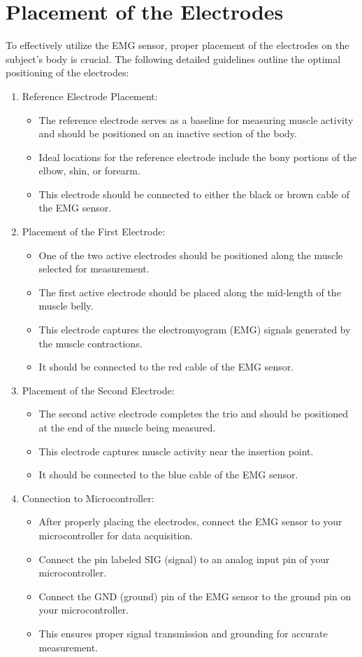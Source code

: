 \documentclass[ 12pt,a4paper,twocolumn,fleqn]{report}
\begin{document}
\section{Placement of the Electrodes}\vskip 6pt
To effectively utilize the EMG sensor, proper placement of the electrodes on the subject's body is crucial. The following detailed guidelines outline the optimal positioning of the electrodes:\vskip 6pt
\begin{enumerate}
    \item Reference Electrode Placement:
    \begin{itemize}
    

   \item  The reference electrode serves as a baseline for measuring muscle activity and should be positioned on an inactive section of the body.
   \item  Ideal locations for the reference electrode include the bony portions of the elbow, shin, or forearm.
   \item  This electrode should be connected to either the black or brown cable of the EMG sensor.
\end{itemize}
   \item  Placement of the First Electrode:
   \begin{itemize}
   \item One of the two active electrodes should be positioned along the muscle selected for measurement.
   \item The first active electrode should be placed along the mid-length of the muscle belly.
   \item This electrode captures the electromyogram (EMG) signals generated by the muscle contractions.
   \item It should be connected to the red cable of the EMG sensor.
   \end{itemize}
\item Placement of the Second Electrode:
\begin{itemize}
   \item The second active electrode completes the trio and should be positioned at the end of the muscle being measured.
   \item This electrode captures muscle activity near the insertion point.
   \item It should be connected to the blue cable of the EMG sensor.
\end{itemize}
\item  Connection to Microcontroller:
\begin{itemize}
   \item After properly placing the electrodes, connect the EMG sensor to your microcontroller for data acquisition.
   \item Connect the pin labeled SIG (signal) to an analog input pin of your microcontroller.
   \item Connect the GND (ground) pin of the EMG sensor to the ground pin on your microcontroller.
   \item This ensures proper signal transmission and grounding for accurate measurement.
\end{itemize}

\end{enumerate}
\end{document}
